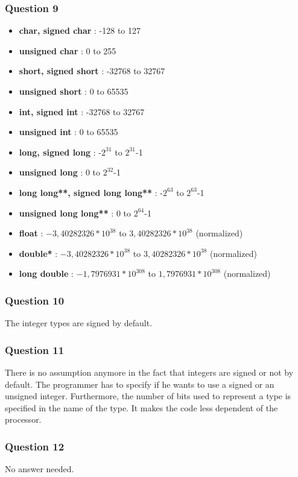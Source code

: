 \documentclass[a4paper,10pt]{article}
\begin{document}
\subsubsection*{Question 9}
\begin{itemize}
 \item \textbf{char, signed char} : -128 to 127
 \item \textbf{unsigned char} : 0 to 255
 \item \textbf{short, signed short} : -32768 to 32767
 \item \textbf{unsigned short} : 0 to 65535
 \item \textbf{int, signed int} : -32768 to 32767
 \item \textbf{unsigned int} : 0 to 65535
 \item \textbf{long, signed long} : -$2^{31}$ to $2^{31}$-1
 \item \textbf{unsigned long} : 0 to $2^{32}$-1
 \item \textbf{long long**, signed long long**} : -$2^{63}$ to $2^{63}$-1
 \item \textbf{unsigned long long**} : 0 to $2^{64}$-1
 \item \textbf{float} : $-3,40282326*10^{38}$ to $3,40282326*10^{38}$ (normalized)
 \item \textbf{double*} : $-3,40282326*10^{38}$ to $3,40282326*10^{38}$ (normalized)
 \item \textbf{long double} : $-1,7976931*10^{308}$ to $1,7976931*10^{308}$ (normalized)
\end{itemize}

\subsubsection*{Question 10}
The integer types are signed by default.

\subsubsection*{Question 11}
There is no assumption anymore in the fact that integers are signed or not by default. The programmer has to specify if he wants to use a signed or an unsigned integer. Furthermore, the number of bits used to represent a type is specified in the name of the type. It makes the code less dependent of the processor.

\subsubsection*{Question 12}
No answer needed.
\end{document}
